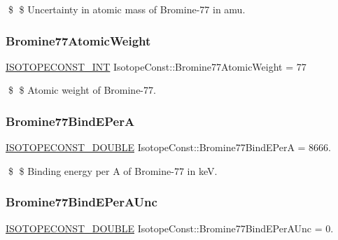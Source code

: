 \$ \$ Uncertainty in atomic mass of Bromine-\/77 in amu. \mbox{\label{group___isotope_const-_bromine-_br77_gafa62ce50a4c58690e91182b1843ebca2}} 
\subsubsection{\texorpdfstring{Bromine77\+Atomic\+Weight}{Bromine77AtomicWeight}}
{\footnotesize\ttfamily \mbox{\hyperlink{group___isotope_const-_macros_ga5f18360b3e99483a35c32d789e62621c}{I\+S\+O\+T\+O\+P\+E\+C\+O\+N\+S\+T\+\_\+\+I\+NT}} Isotope\+Const\+::\+Bromine77\+Atomic\+Weight = 77}

\$ \$ Atomic weight of Bromine-\/77. \mbox{\label{group___isotope_const-_bromine-_br77_ga28afea2d3668ea54b8e5c73d5d9574e5}} 
\subsubsection{\texorpdfstring{Bromine77\+Bind\+E\+PerA}{Bromine77BindEPerA}}
{\footnotesize\ttfamily \mbox{\hyperlink{group___isotope_const-_macros_ga8f45a7272ce02c0b4c65c44636ed719a}{I\+S\+O\+T\+O\+P\+E\+C\+O\+N\+S\+T\+\_\+\+D\+O\+U\+B\+LE}} Isotope\+Const\+::\+Bromine77\+Bind\+E\+PerA = 8666.}

\$ \$ Binding energy per A of Bromine-\/77 in keV. \mbox{\label{group___isotope_const-_bromine-_br77_gaafa715e76ab80cc5b670dcbd7ed8d872}} 
\subsubsection{\texorpdfstring{Bromine77\+Bind\+E\+Per\+A\+Unc}{Bromine77BindEPerAUnc}}
{\footnotesize\ttfamily \mbox{\hyperlink{group___isotope_const-_macros_ga8f45a7272ce02c0b4c65c44636ed719a}{I\+S\+O\+T\+O\+P\+E\+C\+O\+N\+S\+T\+\_\+\+D\+O\+U\+B\+LE}} Isotope\+Const\+::\+Bromine77\+Bind\+E\+Per\+A\+Unc = 0.}

